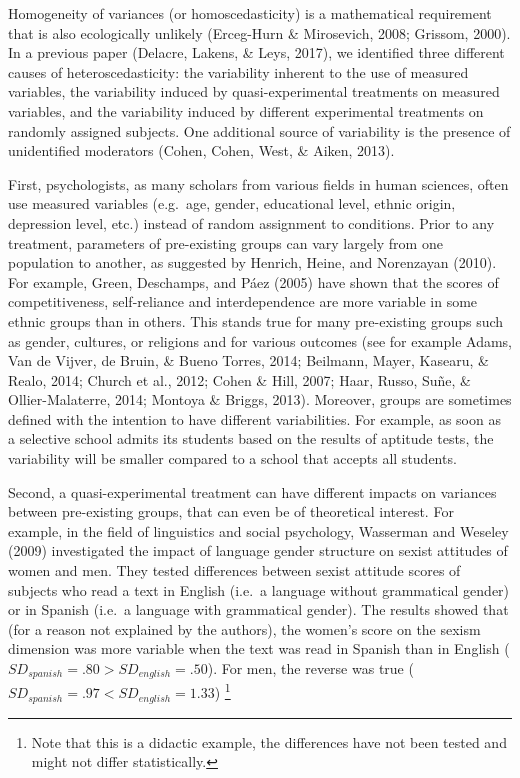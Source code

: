 \documentclass[man,floatsintext]{apa6}
\let\rmarkdownfootnote\footnote%
\def\footnote{\protect\rmarkdownfootnote}
\begin{document}
Homogeneity of variances (or homoscedasticity) is a mathematical requirement that is also ecologically unlikely (Erceg-Hurn \& Mirosevich, 2008; Grissom, 2000). In a previous paper (Delacre, Lakens, \& Leys, 2017), we identified three different causes of heteroscedasticity: the variability inherent to the use of measured variables, the variability induced by quasi-experimental treatments on measured variables, and the variability induced by different experimental treatments on randomly assigned subjects. One additional source of variability is the presence of unidentified moderators (Cohen, Cohen, West, \& Aiken, 2013).

First, psychologists, as many scholars from various fields in human sciences, often use measured variables (e.g.~age, gender, educational level, ethnic origin, depression level, etc.) instead of random assignment to conditions. Prior to any treatment, parameters of pre-existing groups can vary largely from one population to another, as suggested by Henrich, Heine, and Norenzayan (2010). For example, Green, Deschamps, and Páez (2005) have shown that the scores of competitiveness, self-reliance and interdependence are more variable in some ethnic groups than in others. This stands true for many pre-existing groups such as gender, cultures, or religions and for various outcomes (see for example Adams, Van de Vijver, de Bruin, \& Bueno Torres, 2014; Beilmann, Mayer, Kasearu, \& Realo, 2014; Church et al., 2012; Cohen \& Hill, 2007; Haar, Russo, Suñe, \& Ollier-Malaterre, 2014; Montoya \& Briggs, 2013). Moreover, groups are sometimes defined with the intention to have different variabilities. For example, as soon as a selective school admits its students based on the results of aptitude tests, the variability will be smaller compared to a school that accepts all students.

Second, a quasi-experimental treatment can have different impacts on variances between pre-existing groups, that can even be of theoretical interest. For example, in the field of linguistics and social psychology, Wasserman and Weseley (2009) investigated the impact of language gender structure on sexist attitudes of women and men. They tested differences between sexist attitude scores of subjects who read a text in English (i.e.~a language without grammatical gender) or in Spanish (i.e.~a language with grammatical gender). The results showed that (for a reason not explained by the authors), the women's score on the sexism dimension was more variable when the text was read in Spanish than in English (\(SD_{spanish}=.80 > SD_{english}=.50\)). For men, the reverse was true (\(SD_{spanish}=.97 < SD_{english}=1.33\)) \footnote{Note that this is a didactic example, the differences have not been tested and might not differ statistically.}
\end{document}
